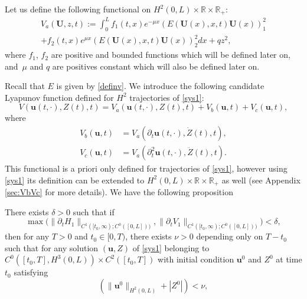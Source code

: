 Let {us} define the following functional on $H^{2}(0,L)\times\mathbb{R}\times\mathbb{R}_{+}$:
\begin{multline}
\label{Va}
V_{a}(\boldsymbol{U},z,t):=\int_{0}^{L}f_{1}(t,x)e^{-\mu x}(E(\boldsymbol{U}(x),x,t)\boldsymbol{U}{(x)})_{1}^{2}\\
+f_{2}(t,x)e^{\mu x}(E(\boldsymbol{U}(x),x,t)\boldsymbol{U}{(x)})_{2}^{2}dx+qz^{2},
\end{multline}
where $f_{1}$, $f_{2}$ are positive and bounded functions which will be defined later on, and~$\mu$ and $q$ are positives constant which will also be defined later on. {Recall that $E$ is given by \eqref{definv}. We introduce the following candidate Lyapunov function defined for $H^{2}$ trajectories of \eqref{sys1}:
\begin{equation}
\label{def-V-tot}
V(\boldsymbol{u}(t,\cdot),Z(t),t) = V_{a}(\boldsymbol{u}(t,\cdot),Z(t),t)+V_{b}(\boldsymbol{u},t)+V_{c}(\boldsymbol{u},t),
\end{equation}
where
\begin{equation}
\begin{split}
V_{b}(\boldsymbol{u},t) &= V_{a}(\partial_{t}\boldsymbol{u}(t,\cdot),\dot Z(t),t),\\
V_{c}(\boldsymbol{u},t) &= V_{a}(\partial_{t}^{2}\boldsymbol{u}(t,\cdot),\ddot Z(t),t).
\end{split}
\label{VbVc2}
\end{equation}
This functional is a priori only defined for trajectories of \eqref{sys1}, however using \eqref{sys1} its definition can be extended to $H^{2}(0,L)\times\mathbb{R}\times\mathbb{R}_{+}$ as well (see Appendix \ref{sec:VbVc} for more details). We have the following proposition
\begin{prop}
\label{propf1f2}
There exists $\delta>0$ such that if
\begin{equation*}
\max\bigl(\lVert\partial_{t}H_{1}\rVert_{C^{1}([t_{0},\infty);{C^{0}([0,L])})},\lVert\partial_{t}V_{1}\rVert_{C^{1}([t_{0},\infty);{C^{0}([0,L])})}\bigr)<\delta,
\end{equation*}
then for any $T>0$ and $t_{0}\in[0,T)$,
there exists $\nu>0$ {depending only on $T-t_{0}$}
such that for any solution $(\boldsymbol{u},Z)$ of \eqref{sys1} belonging to $C^{0}([t_{0},T],H^{3}(0,L))\times C^{2}([t_{0},T])$ with initial condition $\boldsymbol{u}^{0}$ and $Z^{0}$ at time $t_{0}$ satisfying
\begin{equation*}
\left(\lVert \boldsymbol{u}^{0}\rVert_{H^{2}(0,L)}+|Z^{0}|\right)<\nu,
\end{equation*}

\end{prop}}
